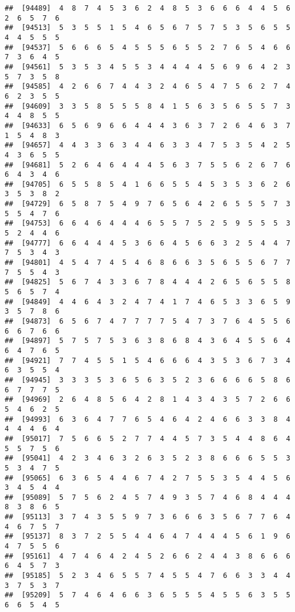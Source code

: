 \documentclass[
]{book}
\begin{document}
\begin{verbatim}
##  [94489]  4  8  7  4  5  3  6  2  4  8  5  3  6  6  6  4  4  5  6  2  6  5  7  6
##  [94513]  5  3  5  5  1  5  4  6  5  6  7  5  7  5  3  5  6  5  5  4  4  5  5  5
##  [94537]  5  6  6  6  5  4  5  5  5  6  5  5  2  7  6  5  4  6  6  7  3  6  4  5
##  [94561]  5  3  5  3  4  5  5  3  4  4  4  4  5  6  9  6  4  2  3  5  7  3  5  8
##  [94585]  4  2  6  6  7  4  4  3  2  4  6  5  4  7  5  6  2  7  4  6  2  3  5  5
##  [94609]  3  3  5  8  5  5  5  8  4  1  5  6  3  5  6  5  5  7  3  4  4  8  5  5
##  [94633]  6  5  6  9  6  6  4  4  4  3  6  3  7  2  6  4  6  3  7  1  5  4  8  3
##  [94657]  4  4  3  3  6  3  4  4  6  3  3  4  7  5  3  5  4  2  5  4  3  6  5  5
##  [94681]  5  2  6  4  6  4  4  4  5  6  3  7  5  5  6  2  6  7  6  6  4  3  4  6
##  [94705]  6  5  5  8  5  4  1  6  6  5  5  4  5  3  5  3  6  2  6  3  5  3  8  2
##  [94729]  6  5  8  7  5  4  9  7  6  5  6  4  2  6  5  5  5  7  3  5  5  4  7  6
##  [94753]  6  6  4  6  4  4  4  6  5  5  7  5  2  5  9  5  5  5  3  5  2  4  4  6
##  [94777]  6  6  4  4  4  5  3  6  6  4  5  6  6  3  2  5  4  4  7  7  5  3  4  3
##  [94801]  4  5  4  7  4  5  4  6  8  6  6  3  5  6  5  5  6  7  7  7  5  5  4  3
##  [94825]  5  6  7  4  3  3  6  7  8  4  4  4  2  6  5  6  5  5  8  5  6  5  7  4
##  [94849]  4  4  6  4  3  2  4  7  4  1  7  4  6  5  3  3  6  5  9  3  5  7  8  6
##  [94873]  6  5  6  7  4  7  7  7  7  5  4  7  3  7  6  4  5  5  6  6  6  7  6  6
##  [94897]  5  7  5  7  5  3  6  3  8  6  8  4  3  6  4  5  5  6  4  6  4  7  6  5
##  [94921]  7  7  4  5  5  1  5  4  6  6  6  4  3  5  3  6  7  3  4  6  3  5  5  4
##  [94945]  3  3  3  5  3  6  5  6  3  5  2  3  6  6  6  6  5  8  6  6  7  7  7  5
##  [94969]  2  6  4  8  5  6  4  2  8  1  4  3  4  3  5  7  2  6  6  5  4  6  2  5
##  [94993]  6  3  6  4  7  7  6  5  4  6  4  2  4  6  6  3  3  8  4  4  4  4  6  4
##  [95017]  7  5  6  6  5  2  7  7  4  4  5  7  3  5  4  4  8  6  4  5  5  7  5  6
##  [95041]  4  2  3  4  6  3  2  6  3  5  2  3  8  6  6  6  5  5  3  5  3  4  7  5
##  [95065]  6  3  6  5  4  4  6  7  4  2  7  5  5  3  5  4  4  5  6  3  4  5  4  4
##  [95089]  5  7  5  6  2  4  5  7  4  9  3  5  7  4  6  8  4  4  4  8  3  8  6  5
##  [95113]  3  7  4  3  5  5  9  7  3  6  6  6  3  5  6  7  7  6  4  4  6  7  5  7
##  [95137]  8  3  7  2  5  5  4  4  6  4  7  4  4  4  5  6  1  9  6  4  7  5  5  6
##  [95161]  4  7  4  6  4  2  4  5  2  6  6  2  4  4  3  8  6  6  6  6  4  5  7  3
##  [95185]  5  2  3  4  6  5  5  7  4  5  5  4  7  6  6  3  3  4  4  3  7  5  3  7
##  [95209]  5  7  4  6  4  6  6  3  6  5  5  5  4  5  5  6  3  5  5  6  6  5  4  5

\end{verbatim}
\end{document}
